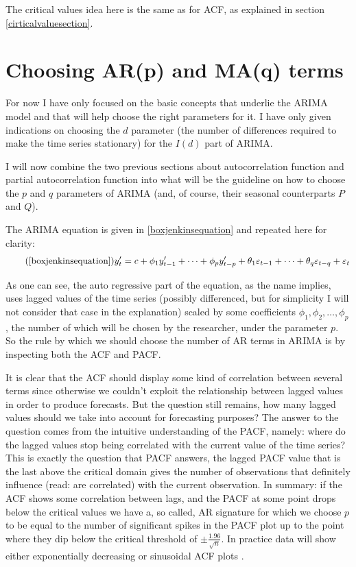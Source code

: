 \documentclass[12pt,a4paper,titlepage]{report}
\begin{document}
The critical values idea here is the same as for ACF, as explained in section \ref{cirticalvaluesection}.

\section{Choosing AR(p) and MA(q) terms}

For now I have only focused on the basic concepts that underlie the ARIMA model and that will help choose the right parameters for it.  I have only given indications on choosing the $ d $ parameter (the number of differences required to make the time series stationary) for the $ I(d) $ part of ARIMA.

I will now combine the two previous sections about autocorrelation function and partial autocorrelation function into what will be the guideline on how to choose the $ p $ and $ q $ parameters of ARIMA (and, of course, their seasonal counterparts $ P $ and $ Q $).

The ARIMA equation is given in \ref{boxjenkinsequation} and repeated here for clarity:
\begin{equation}
\tag{\ref{boxjenkinsequation}}
y'_{t} = c + \phi_{1}y'_{t-1} + \cdots + \phi_{p}y'_{t-p} + \theta_{1}\varepsilon_{t-1} + \cdots + \theta_{q}\varepsilon_{t-q} + \varepsilon_{t}
\end{equation}

As one can see, the auto regressive part of the equation, as the name implies, uses lagged values of the time series (possibly differenced, but for simplicity I will not consider that case in the explanation) scaled by some coefficients $ \phi_{1}, \phi_{2}, \dots, \phi_{p} $, the number of which will be chosen by the researcher, under the parameter $ p $. So the rule by which we should choose the number of AR terms in ARIMA is by inspecting both the ACF and PACF. 

It is clear that the ACF should display some kind of correlation between several terms since otherwise we couldn't exploit the relationship between lagged values in order to produce forecasts. But the question still remains, how many lagged values should we take into account for forecasting purposes? The answer to the question comes from the intuitive understanding of the PACF, namely: where do the lagged values stop being correlated with the current value of the time series? This is exactly the question that PACF answers, the lagged PACF value that is the last above the critical domain gives the number of observations that definitely influence (read: are correlated) with the current observation. In summary: if the ACF shows some correlation between lags, and the PACF at some point drops below the critical values we have a, so called, AR signature for which we choose $ p $ to be equal to the number of significant spikes in the PACF plot up to the point where they dip below the critical threshold of $ \pm \frac{1.96}{\sqrt{n}} $. In practice data will show either exponentially decreasing or sinusoidal ACF plots \cite{fpp2nonseasonalarima}.
\end{document}

